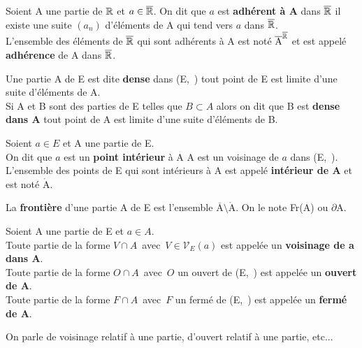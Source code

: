 Soient A une partie de \(\mathbb{R}\) et \(a\in \overline{\mathbb{R}}\). On dit que $a$ est \textbf{adhérent à A} dans \(\overline{\mathbb{R}}\) \ssi il existe une suite \((a_n)\) d'éléments de A qui tend vers $a$ dans \(\overline{\mathbb{R}}\).\vspace{-0.1cm}\\
L'ensemble des éléments de \(\overline{\mathbb{R}}\) qui sont adhérents à A est noté \(\overline{\text{A}}^{\overline{\mathbb{R}}}\) et est appelé \textbf{adhérence} de A dans \(\overline{\mathbb{R}}\).

\newpage

Une partie A de E est dite \textbf{dense} dans (E,\ \normtxt{\ }) \ssi tout point de E est limite d'une suite d'éléments de A.\\
Si A et B sont des parties de E telles que \(B\subset A\) alors on dit que B est \textbf{dense dans A} \ssi tout point de A est limite d'une suite d'éléments de B.

\vspace{1.3cm}

Soient \(a\in E\) et A une partie de E.\\
On dit que \(a\) est un \textbf{point intérieur} à A \ssi A est un voisinage de $a$ dans (E,\ \normtxt{\ }).\vspace{0.1cm}\\
L'ensemble des points de E qui sont intérieurs à A est appelé \textbf{intérieur de A} et est noté \(\mathring{\text{A}}\).

\vspace{1.3cm}

La \textbf{frontière} d'une partie A de E est l'ensemble \(\overline{\text{A}}\setminus \mathring{\text{A}}\). On le note Fr(A) ou \(\partial\)A.

\vspace{1.3cm}

Soient A une partie de E et \(a\in A\).\vspace{0.1cm}\\
Toute partie de la forme \(V\cap A\) \,avec\, \(V\in \mathcal{V}_E(a)\) est appelée un \textbf{voisinage de a dans A}.\vspace{0.1cm}\\
Toute partie de la forme \(O\cap A\) \,avec\, $O$ un ouvert de (E,\ \normtxt{\ }) est appelée un \textbf{ouvert de A}.\vspace{0.1cm}\\
Toute partie de la forme \(F\cap A\) \,avec\, $F$ un fermé de (E,\ \normtxt{\ }) est appelée un \textbf{fermé de A}.\vspace{0.2cm}\\
\begin{small}On parle de voisinage relatif à une partie, d'ouvert relatif à une partie, etc...\end{small}

